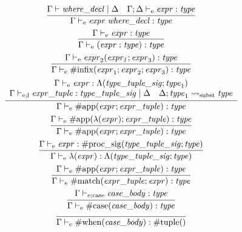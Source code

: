 \begin{gather*}
    \infer{\Gamma \vdash_\mathrm{e} \mathit{expr}\; \mathit{where\_decl}: \mathit{type}}{
        \Gamma \vdash \mathit{where\_decl} \mid \Delta
        &
        \Gamma; \Delta \vdash_\mathrm{e} \mathit{expr}: \mathit{type}
    }
    \\
    \infer{\Gamma \vdash_\mathrm{e} (\mathit{expr}: \mathit{type}): \mathit{type}}{
        \Gamma \vdash_\mathrm{e} \mathit{expr}: \mathit{type}
    }
    \\
    \infer{\Gamma \vdash_\mathrm{e} \mathrm{\#infix}(\mathit{expr}_1; \mathit{expr}_2; \mathit{expr}_3): \mathit{type}}{
        \Gamma \vdash_\mathrm{e} \mathit{expr}_2(\mathit{expr_1}; \mathit{expr}_3): \mathit{type}
    }
    \\
    \infer{\Gamma \vdash_\mathrm{e} \mathrm{\#app}(\mathit{expr}; \mathit{expr\_tuple}): \mathit{type}}{
        \begin{array}{c}
            \Gamma \vdash_\mathrm{e} \mathit{expr}: \Lambda(\mathit{type\_tuple\_sig}; \mathit{type}_1)
            \\
            \Gamma \vdash_{\mathrm{e}; \mathrm{l}} \mathit{expr\_tuple}: \mathit{type\_tuple\_sig} \mid \Delta
            \hspace{1em}
            \Delta; \mathit{type}_1 \rightsquigarrow_\mathrm{subst} \mathit{type}
        \end{array}
    }
    \\
    \infer{\Gamma \vdash_\mathrm{e} \mathrm{\#app}(\mathit{expr}; \mathit{expr\_tuple}): \mathit{type}}{
        \Gamma \vdash_\mathrm{e} \mathrm{\#app}(\lambda(\mathit{expr}); \mathit{expr\_tuple}): \mathit{type}
    }
    \\
    \infer{\Gamma \vdash_\mathrm{e} \lambda(\mathit{expr}): \Lambda(\mathit{type\_tuple\_sig}; \mathit{type})}{
        \Gamma \vdash_\mathrm{e} \mathit{expr}: \mathrm{\#proc\_sig}(\mathit{type\_tuple\_sig}; \mathit{type})
    }
    \\
    \infer{\Gamma \vdash_\mathrm{e} \mathrm{\#match}(\mathit{expr\_tuple}; \mathit{expr}): \mathit{type}}{
        \Gamma \vdash_\mathrm{e} \mathrm{\#app}(\mathit{expr}; \mathit{expr\_tuple}): \mathit{type}
    }
    \\
    \infer{\Gamma \vdash_\mathrm{e} \mathrm{\#case}(\mathit{case\_body}): \mathit{type}}{
        \Gamma \vdash_{\mathrm{e}; \mathrm{case}} \mathit{case\_body}: \mathit{type}
    }
    \\
    \infer{\Gamma \vdash_\mathrm{e} \mathrm{\#when}(\mathit{case\_body}): \mathrm{\#tuple}()}{
}
\end{gather*}
